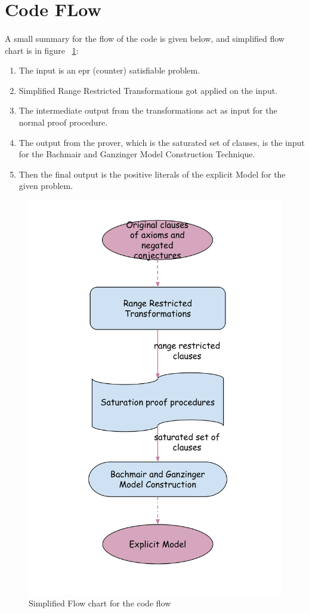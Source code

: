 \section{Code FLow}\label{sec:c3s3}
	
	\paragraph{}
	A small summary for the flow of the code is given below, and simplified flow chart is in figure ~\ref{fig:simplified_code_flow}:
		
		\begin{enumerate}
			\item The input is an \ac{epr} (counter) satisfiable problem.
			\item Simplified Range Restricted Transformations got applied on the input.
			\item The intermediate output from the transformations act as input for the normal proof procedure.
			\item The output from the prover, which is the saturated set of clauses, is the input for the Bachmair and Ganzinger Model Construction Technique. 
			\item Then the final output is the positive literals of the explicit Model for the given problem.  
		\end{enumerate}
		
		
		\begin{figure}[H]
			\centering
			\includegraphics[scale=0.42]{pictures/simplified_code_flow.pdf}
			\caption{Simplified Flow chart for the code flow\label{fig:simplified_code_flow}}
		\end{figure}
		
	